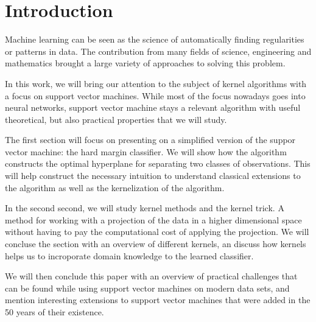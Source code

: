 \section{Introduction}

Machine learning can be seen as the science of automatically finding regularities or patterns in data. The contribution from many fields of science, engineering and mathematics brought a large variety of approaches to solving this problem.

In this work, we will bring our attention to the subject of kernel algorithms with a focus on support vector machines. While most of the focus nowadays goes into neural networks, support vector machine stays a relevant algorithm with useful theoretical, but also practical properties that we will study.

The first section will focus on presenting on a simplified version of the suppor vector machine: the hard margin classifier. We will show how the algorithm constructs the optimal hyperplane for separating two classes of observations. This will help construct the necessary intuition to understand classical extensions to the algorithm as well as the kernelization of the algorithm.

In the second second, we will study kernel methods and the kernel trick. A method for working with a projection of the data in a higher dimensional space without having to pay the computational cost of applying the projection. We will concluse the section with an overview of different kernels, an discuss how kernels helps us to incroporate domain knowledge to the learned classifier.

We will then conclude this paper with an overview of practical challenges that can be found while using support vector machines on modern data sets, and mention interesting extensions to support vector machines that were added in the 50 years of their existence.

